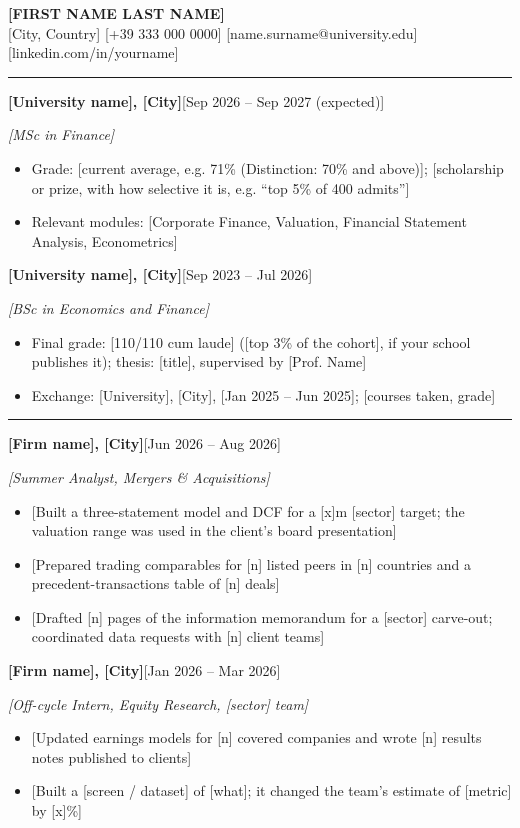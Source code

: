 \documentclass[10pt,a4paper]{article}
\newcommand{\cvsection}[1]{\vspace{7pt}{\large\bfseries\MakeUppercase{#1}}\par\vspace{1pt}\hrule\vspace{3pt}}
\newcommand{\cventry}[2]{\vspace{2pt}\textbf{#1}\hfill #2\par}
\newcommand{\cvsub}[1]{\textit{#1}\par}
\begin{document}
\begin{center}{\LARGE\bfseries [FIRST NAME LAST NAME]}\\[3pt]
[City, Country] \textperiodcentered{} [+39 333 000 0000] \textperiodcentered{} [name.surname@university.edu] \textperiodcentered{} [linkedin.com/in/yourname]
\end{center}
\cvsection{Education}
\cventry{[University name], [City]}{[Sep 2026 -- Sep 2027 (expected)]}
\cvsub{[MSc in Finance]}
\begin{itemize}
  \item Grade: [current average, e.g. 71\% (Distinction: 70\% and above)]; [scholarship or prize, with how selective it is, e.g. ``top 5\% of 400 admits'']
  \item Relevant modules: [Corporate Finance, Valuation, Financial Statement Analysis, Econometrics]
\end{itemize}
\cventry{[University name], [City]}{[Sep 2023 -- Jul 2026]}
\cvsub{[BSc in Economics and Finance]}
\begin{itemize}
  \item Final grade: [110/110 cum laude] ([top 3\% of the cohort], if your school publishes it); thesis: [title], supervised by [Prof. Name]
  \item Exchange: [University], [City], [Jan 2025 -- Jun 2025]; [courses taken, grade]
\end{itemize}
\cvsection{Experience}
\cventry{[Firm name], [City]}{[Jun 2026 -- Aug 2026]}
\cvsub{[Summer Analyst, Mergers \& Acquisitions]}
\begin{itemize}
  \item {}[Built a three-statement model and DCF for a \texteuro{}[x]m [sector] target; the valuation range was used in the client's board presentation]
  \item {}[Prepared trading comparables for [n] listed peers in [n] countries and a precedent-transactions table of [n] deals]
  \item {}[Drafted [n] pages of the information memorandum for a [sector] carve-out; coordinated data requests with [n] client teams]
\end{itemize}
\cventry{[Firm name], [City]}{[Jan 2026 -- Mar 2026]}
\cvsub{[Off-cycle Intern, Equity Research, [sector] team]}
\begin{itemize}
  \item {}[Updated earnings models for [n] covered companies and wrote [n] results notes published to clients]
  \item {}[Built a [screen / dataset] of [what]; it changed the team's estimate of [metric] by [x]\%]
\end{itemize}
\end{document}
